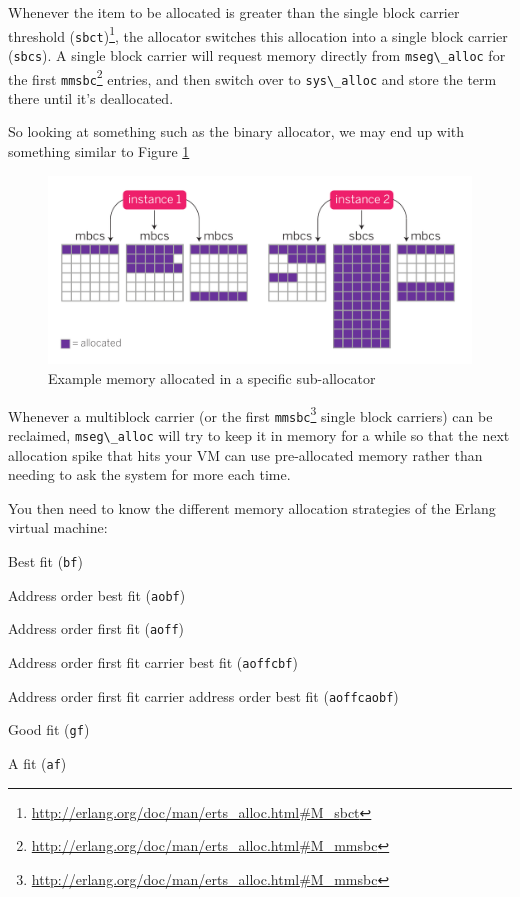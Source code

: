 \documentclass[11pt, oneside]{book}   	%
\newcommand{\term}[1]{\Verb`#1`}
\begin{document}
Whenever the item to be allocated is greater than the single block carrier threshold (\term{sbct})\footnote{\href{http://erlang.org/doc/man/erts\_alloc.html\#M\_sbct}{http://erlang.org/doc/man/erts\_alloc.html\#M\_sbct}}, the allocator switches this allocation into a single block carrier (\term{sbcs}). A single block carrier will request memory directly from \term{mseg\_alloc} for the first \term{mmsbc}\footnote{\href{http://erlang.org/doc/man/erts\_alloc.html\#M\_mmsbc}{http://erlang.org/doc/man/erts\_alloc.html\#M\_mmsbc}} entries, and then switch over to \term{sys\_alloc} and store the term there until it's deallocated.

So looking at something such as the binary allocator, we may end up with something similar to Figure \ref{fig:allocation-1-normal}

\begin{figure}
  \includegraphics{allocation-1-normal.pdf}%
  \caption{Example memory allocated in a specific sub-allocator}%
   \label{fig:allocation-1-normal}
\end{figure}

Whenever a multiblock carrier (or the first \term{mmsbc}\footnote{\href{http://erlang.org/doc/man/erts\_alloc.html\#M\_mmsbc}{http://erlang.org/doc/man/erts\_alloc.html\#M\_mmsbc}} single block carriers) can be reclaimed, \term{mseg\_alloc} will try to keep it in memory for a while so that the next allocation spike that hits your VM can use pre-allocated memory rather than needing to ask the system for more each time.

You then need to know the different memory allocation strategies of the Erlang virtual machine:

\begin{enumerate*}
    \item Best fit (\term{bf})
    \item Address order best fit (\term{aobf})
    \item Address order first fit (\term{aoff})
    \item Address order first fit carrier best fit (\term{aoffcbf})
    \item Address order first fit carrier address order best fit (\term{aoffcaobf})
    \item Good fit (\term{gf})
    \item A fit (\term{af})
\end{enumerate*}
\end{document}
